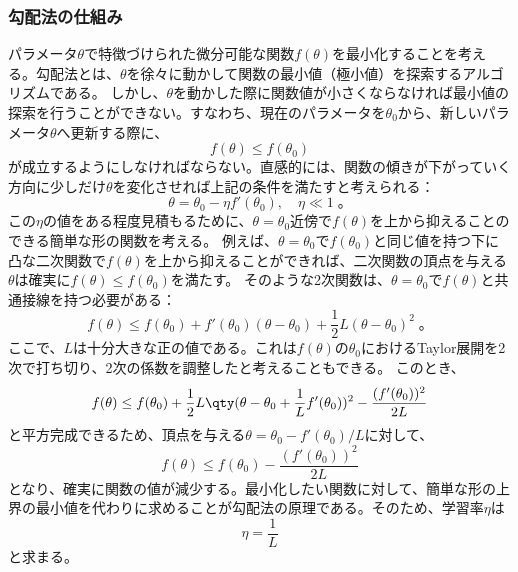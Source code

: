 \documentclass[a4paper,11pt,uplatex]{jsarticle}%
\begin{document}
\subsubsection{勾配法の仕組み}
パラメータ$\theta$で特徴づけられた微分可能な関数$f(\theta)$を最小化することを考える。勾配法とは、$\theta$を徐々に動かして関数の最小値（極小値）を探索するアルゴリズムである。
しかし、$\theta$を動かした際に関数値が小さくならなければ最小値の探索を行うことができない。すなわち、現在のパラメータを$\theta_0$から、新しいパラメータ$\theta$へ更新する際に、
\begin{equation}
  f(\theta)\leq f(\theta_0)
\end{equation}
が成立するようにしなければならない。直感的には、関数の傾きが下がっていく方向に少しだけ$\theta$を変化させれば上記の条件を満たすと考えられる：
\begin{equation}
  \theta=\theta_0-\eta f'(\theta_0),\quad\eta\ll 1\;。
\end{equation}
この$\eta$の値をある程度見積もるために、$\theta=\theta_0$近傍で$f(\theta)$を上から抑えることのできる簡単な形の関数を考える。
例えば、$\theta=\theta_0$で$f(\theta_0)$と同じ値を持つ下に凸な二次関数で$f(\theta)$を上から抑えることができれば、二次関数の頂点を与える$\theta$は確実に$f(\theta)\leq f(\theta_0)$を満たす。
そのような2次関数は、$\theta=\theta_0$で$f(\theta)$と共通接線を持つ必要がある：
\begin{equation}
  f(\theta)\leq f(\theta_0) + f'(\theta_0)(\theta-\theta_0) + \frac{1}{2}L(\theta-\theta_0)^2\;。
\end{equation}
ここで、$L$は十分大きな正の値である。これは$f(\theta)$の$\theta_0$におけるTaylor展開を2次で打ち切り、2次の係数を調整したと考えることもできる。
このとき、
\begin{equation}
  f(\theta)\leq f(\theta_0)+\frac{1}{2}L\qty(\theta-\theta_0+\frac{1}{L}f'(\theta_0))^2-\frac{(f'(\theta_0))^2}{2L}
\end{equation}
と平方完成できるため、頂点を与える$\theta=\theta_0-f'(\theta_0)/L$に対して、
\begin{equation}
  f(\theta)\leq f(\theta_0)-\frac{(f'(\theta_0))^2}{2L}
\end{equation}
となり、確実に関数の値が減少する。最小化したい関数に対して、簡単な形の上界の最小値を代わりに求めることが勾配法の原理である。そのため、学習率$\eta$は
\begin{equation}
  \eta=\frac{1}{L}
\end{equation}
と求まる。
\end{document}
